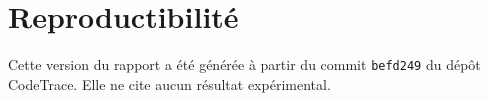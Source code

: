 \section{Reproductibilité}\label{ann:repro}
	Cette version du rapport a été générée à partir du commit \texttt{befd249} du dépôt CodeTrace. Elle ne cite aucun résultat expérimental.

